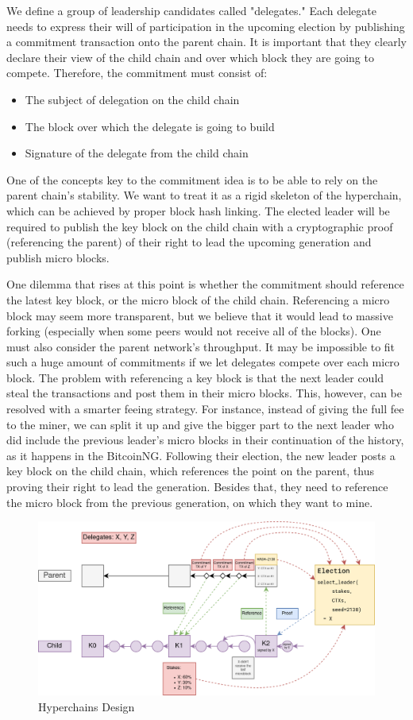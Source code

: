 We define a group of leadership candidates called "delegates." Each delegate
needs to express their will of participation in the upcoming election by
publishing a commitment transaction onto the parent chain. It is important that
they clearly declare their view of the child chain and over which block they are
going to compete. Therefore, the commitment must consist of:

\begin{itemize}
\item The subject of delegation on the child chain
\item The block over which the delegate is going to build
\item Signature of the delegate from the child chain
\end{itemize}

One of the concepts key to the commitment idea is to be able to rely on the
parent chain's stability. We want to treat it as a rigid skeleton of the
hyperchain, which can be achieved by proper block hash linking. The elected
leader will be required to publish the key block on the child chain with a
cryptographic proof (referencing the parent) of their right to lead the upcoming
generation and publish micro blocks.

One dilemma that rises at this point is whether the commitment should reference
the latest key block, or the micro block of the child chain. Referencing a micro
block may seem more transparent, but we believe that it would lead to massive
forking (especially when some peers would not receive all of the blocks). One
must also consider the parent network's throughput. It may be impossible to fit
such a huge amount of commitments if we let delegates compete over each micro
block. The problem with referencing a key block is that the next leader could
steal the transactions and post them in their micro blocks. This, however, can
be resolved with a smarter feeing strategy. For instance, instead of giving the
full fee to the miner, we can split it up and give the bigger part to the next
leader who did include the previous leader's micro blocks in their continuation
of the history, as it happens in the BitcoinNG\cite{incentive_bcng}. Following
their election, the new leader posts a key block on the child chain, which
references the point on the parent, thus proving their right to lead the
generation. Besides that, they need to reference the micro block from the
previous generation, on which they want to mine.


\begin{figure}[h]
	\caption{Hyperchains Design}
	\centering
	\includegraphics[scale=0.4]{hyperchains_design}
\end{figure}
